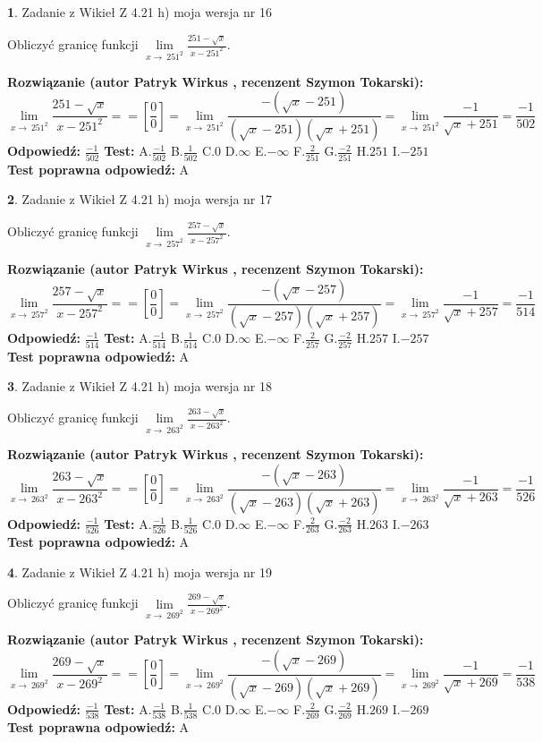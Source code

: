 \documentclass[12pt, a4paper]{article}
\theoremstyle{definition} %
\newtheorem{zad}{}
\newcommand{\zadStart}[1]{\begin{zad}#1\newline}
\newcommand{\zadStop}{\end{zad}}
\newcommand{\rozwStart}[2]{\noindent \textbf{Rozwiązanie (autor #1 , recenzent #2): }\newline}
\newcommand{\rozwStop}{\newline}
\newcommand{\odpStart}{\noindent \textbf{Odpowiedź:}\newline}
\newcommand{\odpStop}{\newline}
\newcommand{\testStart}{\noindent \textbf{Test:}\newline}
\newcommand{\testStop}{\newline}
\newcommand{\kluczStart}{\noindent \textbf{Test poprawna odpowiedź:}\newline}
\newcommand{\kluczStop}{\newline}
\begin{document}
\zadStart{Zadanie z Wikieł Z 4.21 h) moja wersja nr 16}

Obliczyć granicę funkcji $\lim\limits_{x\to\ 251^{2}}\frac{251-\sqrt{x}}{x-251^{2}}$.
\zadStop
\rozwStart{Patryk Wirkus}{Szymon Tokarski}
$$\lim\limits_{x\to\ 251^{2}}\frac{251-\sqrt{x}}{x-251^{2}} = = [\frac{0}{0}] = \lim\limits_{x\to\ 251^{2}}\frac{-(\sqrt{x}-251)}{(\sqrt{x}-251)(\sqrt{x}+251)} = \lim\limits_{x\to\ 251^{2}}\frac{-1}{\sqrt{x}+251} = \frac{-1}{502}$$
\rozwStop
\odpStart
$\frac{-1}{502}$
\odpStop
\testStart
A.$\frac{-1}{502}$ B.$\frac{1}{502}$ C.$0$ D.$\infty$ E.$-\infty$
F.$\frac{2}{251}$ G.$\frac{-2}{251}$
H.$251$
I.$-251$
\testStop
\kluczStart
A
\kluczStop



\zadStart{Zadanie z Wikieł Z 4.21 h) moja wersja nr 17}

Obliczyć granicę funkcji $\lim\limits_{x\to\ 257^{2}}\frac{257-\sqrt{x}}{x-257^{2}}$.
\zadStop
\rozwStart{Patryk Wirkus}{Szymon Tokarski}
$$\lim\limits_{x\to\ 257^{2}}\frac{257-\sqrt{x}}{x-257^{2}} = = [\frac{0}{0}] = \lim\limits_{x\to\ 257^{2}}\frac{-(\sqrt{x}-257)}{(\sqrt{x}-257)(\sqrt{x}+257)} = \lim\limits_{x\to\ 257^{2}}\frac{-1}{\sqrt{x}+257} = \frac{-1}{514}$$
\rozwStop
\odpStart
$\frac{-1}{514}$
\odpStop
\testStart
A.$\frac{-1}{514}$ B.$\frac{1}{514}$ C.$0$ D.$\infty$ E.$-\infty$
F.$\frac{2}{257}$ G.$\frac{-2}{257}$
H.$257$
I.$-257$
\testStop
\kluczStart
A
\kluczStop



\zadStart{Zadanie z Wikieł Z 4.21 h) moja wersja nr 18}

Obliczyć granicę funkcji $\lim\limits_{x\to\ 263^{2}}\frac{263-\sqrt{x}}{x-263^{2}}$.
\zadStop
\rozwStart{Patryk Wirkus}{Szymon Tokarski}
$$\lim\limits_{x\to\ 263^{2}}\frac{263-\sqrt{x}}{x-263^{2}} = = [\frac{0}{0}] = \lim\limits_{x\to\ 263^{2}}\frac{-(\sqrt{x}-263)}{(\sqrt{x}-263)(\sqrt{x}+263)} = \lim\limits_{x\to\ 263^{2}}\frac{-1}{\sqrt{x}+263} = \frac{-1}{526}$$
\rozwStop
\odpStart
$\frac{-1}{526}$
\odpStop
\testStart
A.$\frac{-1}{526}$ B.$\frac{1}{526}$ C.$0$ D.$\infty$ E.$-\infty$
F.$\frac{2}{263}$ G.$\frac{-2}{263}$
H.$263$
I.$-263$
\testStop
\kluczStart
A
\kluczStop



\zadStart{Zadanie z Wikieł Z 4.21 h) moja wersja nr 19}

Obliczyć granicę funkcji $\lim\limits_{x\to\ 269^{2}}\frac{269-\sqrt{x}}{x-269^{2}}$.
\zadStop
\rozwStart{Patryk Wirkus}{Szymon Tokarski}
$$\lim\limits_{x\to\ 269^{2}}\frac{269-\sqrt{x}}{x-269^{2}} = = [\frac{0}{0}] = \lim\limits_{x\to\ 269^{2}}\frac{-(\sqrt{x}-269)}{(\sqrt{x}-269)(\sqrt{x}+269)} = \lim\limits_{x\to\ 269^{2}}\frac{-1}{\sqrt{x}+269} = \frac{-1}{538}$$
\rozwStop
\odpStart
$\frac{-1}{538}$
\odpStop
\testStart
A.$\frac{-1}{538}$ B.$\frac{1}{538}$ C.$0$ D.$\infty$ E.$-\infty$
F.$\frac{2}{269}$ G.$\frac{-2}{269}$
H.$269$
I.$-269$
\testStop
\kluczStart
A
\kluczStop
\end{document}
